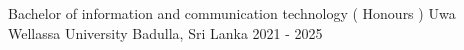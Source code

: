 

\begin{cventries}

  \cventry
    {Bachelor of information and communication technology ( Honours )} %
    {Uwa Wellassa University} %
    {Badulla, Sri Lanka} %
    {2021 - 2025} %
	{}

\end{cventries}
